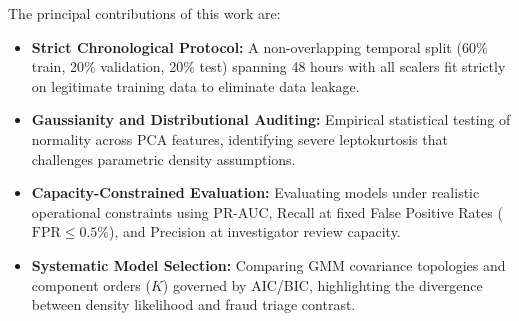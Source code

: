 The principal contributions of this work are:
\begin{itemize}
    \item \textbf{Strict Chronological Protocol:} A non-overlapping temporal split (60\% train, 20\% validation, 20\% test) spanning 48 hours with all scalers fit strictly on legitimate training data to eliminate data leakage.
    \item \textbf{Gaussianity and Distributional Auditing:} Empirical statistical testing of normality across PCA features, identifying severe leptokurtosis that challenges parametric density assumptions.
    \item \textbf{Capacity-Constrained Evaluation:} Evaluating models under realistic operational constraints using PR-AUC, Recall at fixed False Positive Rates ($\text{FPR} \le 0.5\%$), and Precision at investigator review capacity.
    \item \textbf{Systematic Model Selection:} Comparing GMM covariance topologies and component orders ($K$) governed by AIC/BIC, highlighting the divergence between density likelihood and fraud triage contrast.
\end{itemize}
